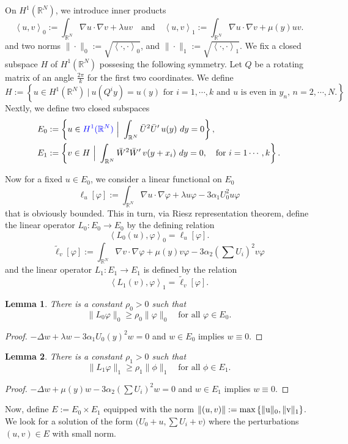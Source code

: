 \documentclass[a4paper,11pt]{article}
\def\blue{\color{blue}}
\def\blue{\color{blue}}
\newtheorem{lemma}{Lemma}[section]
\numberwithin{step}{dummy}
\begin{document}
On $H^1( \mathbb{R}^N)$, we introduce inner products
$$ \left<u,v\right>_0:= \int_{ \mathbb{R}^N} \nabla u\cdot\nabla v + \lambda uv \quad \text{and} \quad \left<u,v\right>_1:= \int_{ \mathbb{R}^N} \nabla u\cdot\nabla v + \mu(y) uv.$$ and two norms $\|\cdot\|_0:=\sqrt{\left<\cdot,\cdot\right>_0}$, and $\|\cdot\|_1:=\sqrt{\left<\cdot,\cdot\right>_1}$. We fix a closed subspace $H$ of $H^1( \mathbb{R}^N)$ possesing the following symmetry. Let $Q$ be a rotating matrix of an angle $\frac{2\pi}{k}$ for the first two coordinates. We define 
\begin{equation*}
 H:= \left\{ u \in H^1 (\mathbb{R}^N) ~\Big|~ \text{$u(Q^iy) = u(y)$ for $i=1,\cdots,k$ and $u$ is even in $y_n$, $n=2,\cdots,N$.}\right\}
\end{equation*}
Nextly, we define two closed subspaces 
\begin{equation}
 \begin{aligned}
 E_0&:= \left\{ u \in {\blue H^1( \mathbb{R}^N)} ~\Big|~ \int_{\mathbb{R}^N}   \bar{U}^2 \bar{U}^\prime \,u(y)~dy = 0 \right\}, \\
 E_1&:= \left\{ v \in H ~\Big|~ \int_{\mathbb{R}^N}   \bar{W}^2 \bar{W}^\prime \,v(y+x_i)~dy = 0, \quad \text{for $i=1\cdots,k$} \right\}.
 \end{aligned}
\end{equation}


Now for a fixed $u \in E_0$, we consider a linear functional on $E_0$
$$\ell_u[\varphi] := \int_{ \mathbb{R}^N} \nabla u\cdot\nabla\varphi + \lambda u \varphi - 3\alpha_1 U_0^2 u\varphi$$
that is obviously bounded. This in turn, via Riesz representation theorem, define the linear operator $L_0: E_0 \rightarrow E_0$ by the defining relation
$$\left<L_0(u),\varphi\right>_0 = \ell_u[\varphi].$$
$$\tilde\ell_v[\varphi]:=\int_{ \mathbb{R}^N} \nabla v\cdot\nabla\varphi + \mu(y) v \varphi - 3\alpha_2 \left(\sum U_i\right)^2 v\varphi$$
and the linear operator $L_1: E_1 \rightarrow E_1$ is defined by the relation
$$\left<L_1(v),\varphi\right>_1 = \tilde\ell_v[\varphi].$$




\begin{lemma} There is a constant $\rho_0>0$ such that
$$ \|L_0 \varphi\|_0 \ge \rho_0 \|\varphi\|_0 \quad \text{for all $\varphi \in E_0$}.$$
\end{lemma}
\begin{proof}
\blue
 $-\Delta w + \lambda w - 3\alpha_1U_0(y)^2 w = 0$ and $w \in E_0$ implies $w\equiv0$. 
\end{proof}
\begin{lemma} There is a constant $\rho_1>0$ such that
$$ \|L_1 \varphi\|_1 \ge \rho_1 \|\phi\|_1 \quad \text{for all $\phi \in E_1$}.$$
\end{lemma}
\begin{proof}
\blue
 $-\Delta w + \mu(y) w - 3\alpha_2\left(\sum U_i\right)^2 w = 0$ and $w \in E_1$ implies $w\equiv0$. 
\end{proof}
Now, define $E:= E_0 \times E_1$ equipped with the norm $\|(u,v)\|:= \rm{max} \left\{ \|u\|_0, \|v\|_1\right\}$. We look for a solution of the form $\big(U_0 +u, \sum U_i + v\big)$ where the perturbations $(u,v)\in E$ with small norm. 
\end{document}

